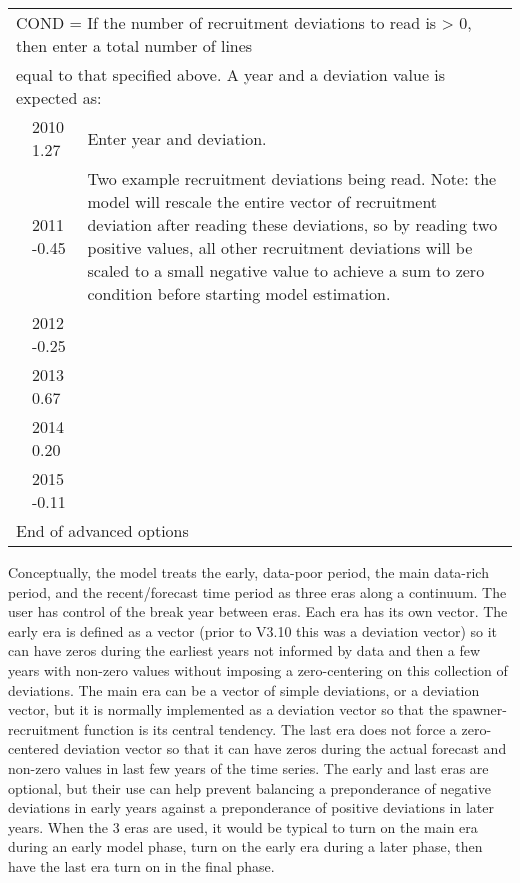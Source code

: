 \begin{longtable}{p{1cm} p{3cm} p{11cm}}
	\multicolumn{3}{l}{COND = If the number of recruitment deviations to read is > 0, then enter a total number of lines} \Tstrut\\
	\multicolumn{3}{l}{equal to that specified above. A year and a deviation value is expected as:} \Bstrut\\
	& 2010 1.27 & Enter year and deviation. \\
	& 2011 -0.45 & \multirow{1}{1cm}[-0.25cm]{\parbox{11cm}{Two example recruitment deviations being read. Note: the model will rescale the entire vector of recruitment deviation after reading these deviations, so by reading two positive values, all other recruitment deviations will be scaled to a small negative value to achieve a sum to zero condition before starting model estimation.}} \\
	& 2012 -0.25 & \\
	& 2013 0.67 & \\
	& 2014 0.20 & \\
	& 2015 -0.11 & \Bstrut\\
	\hline
	
		
	\multicolumn{3}{l}{End of advanced options} \Tstrut\Bstrut\\
	\hline
	
\end{longtable}

Conceptually, the model treats the early, data-poor period, the main data-rich period, and the recent/forecast time period as three eras along a continuum. The user has control of the break year between eras. Each era has its own vector. The early era is defined as a vector (prior to V3.10 this was a deviation vector) so it can have zeros during the earliest years not informed by data and then a few years with non-zero values without imposing a zero-centering on this collection of deviations. The main era can be a vector of simple deviations, or a deviation vector, but it is normally implemented as a deviation vector so that the spawner-recruitment function is its central tendency. The last era does not force a zero-centered deviation vector so that it can have zeros during the actual forecast and non-zero values in last few years of the time series. The early and last eras are optional, but their use can help prevent balancing a preponderance of negative deviations in early years against a preponderance of positive deviations in later years. When the 3 eras are used, it would be typical to turn on the main era during an early model phase, turn on the early era during a later phase, then have the last era turn on in the final phase.

